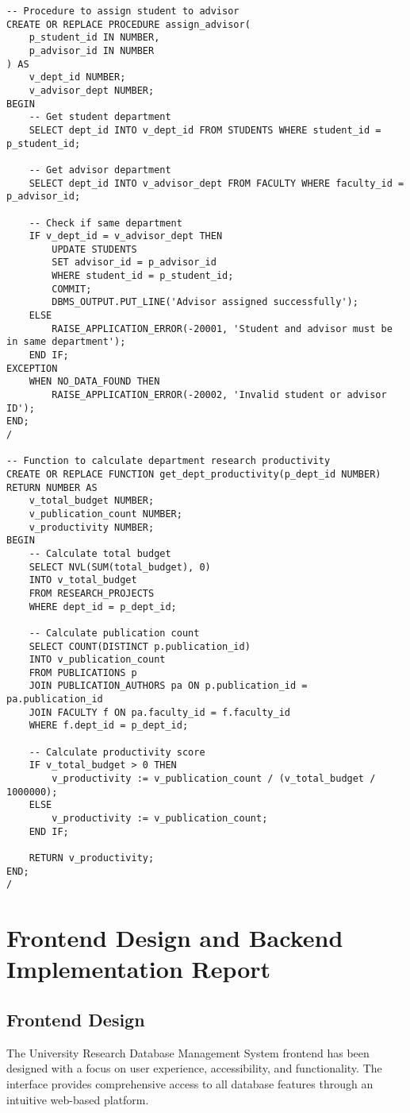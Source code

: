 \documentclass[12pt,a4paper]{article}
\begin{document}
\begin{lstlisting}[style=sqlstyle]
-- Procedure to assign student to advisor
CREATE OR REPLACE PROCEDURE assign_advisor(
    p_student_id IN NUMBER,
    p_advisor_id IN NUMBER
) AS
    v_dept_id NUMBER;
    v_advisor_dept NUMBER;
BEGIN
    -- Get student department
    SELECT dept_id INTO v_dept_id FROM STUDENTS WHERE student_id = p_student_id;
    
    -- Get advisor department
    SELECT dept_id INTO v_advisor_dept FROM FACULTY WHERE faculty_id = p_advisor_id;
    
    -- Check if same department
    IF v_dept_id = v_advisor_dept THEN
        UPDATE STUDENTS 
        SET advisor_id = p_advisor_id 
        WHERE student_id = p_student_id;
        COMMIT;
        DBMS_OUTPUT.PUT_LINE('Advisor assigned successfully');
    ELSE
        RAISE_APPLICATION_ERROR(-20001, 'Student and advisor must be in same department');
    END IF;
EXCEPTION
    WHEN NO_DATA_FOUND THEN
        RAISE_APPLICATION_ERROR(-20002, 'Invalid student or advisor ID');
END;
/

-- Function to calculate department research productivity
CREATE OR REPLACE FUNCTION get_dept_productivity(p_dept_id NUMBER)
RETURN NUMBER AS
    v_total_budget NUMBER;
    v_publication_count NUMBER;
    v_productivity NUMBER;
BEGIN
    -- Calculate total budget
    SELECT NVL(SUM(total_budget), 0) 
    INTO v_total_budget
    FROM RESEARCH_PROJECTS 
    WHERE dept_id = p_dept_id;
    
    -- Calculate publication count
    SELECT COUNT(DISTINCT p.publication_id)
    INTO v_publication_count
    FROM PUBLICATIONS p
    JOIN PUBLICATION_AUTHORS pa ON p.publication_id = pa.publication_id
    JOIN FACULTY f ON pa.faculty_id = f.faculty_id
    WHERE f.dept_id = p_dept_id;
    
    -- Calculate productivity score
    IF v_total_budget > 0 THEN
        v_productivity := v_publication_count / (v_total_budget / 1000000);
    ELSE
        v_productivity := v_publication_count;
    END IF;
    
    RETURN v_productivity;
END;
/
\end{lstlisting}

\section{Frontend Design and Backend Implementation Report}

\subsection{Frontend Design}
The University Research Database Management System frontend has been designed with a focus on user experience, accessibility, and functionality. The interface provides comprehensive access to all database features through an intuitive web-based platform.
\end{document}
